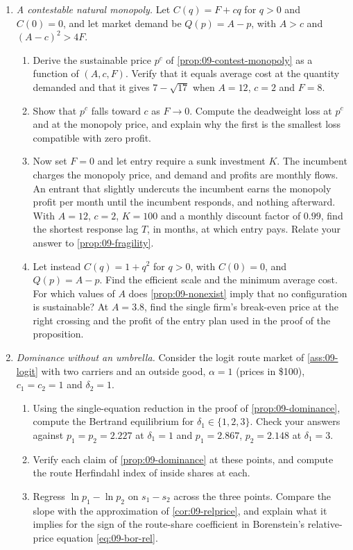 \begin{enumerate}[label=\arabic*., leftmargin=*, itemsep=6pt]

\item \emph{A contestable natural monopoly.} Let $C(q)=F+cq$ for $q>0$ and $C(0)=0$, and let market demand
be $Q(p)=A-p$, with $A>c$ and $(A-c)^2>4F$.
\begin{enumerate}[label=(\alph*)]
\item Derive the sustainable price $p^c$ of \cref{prop:09-contest-monopoly} as a function of $(A,c,F)$.
Verify that it equals average cost at the quantity demanded and that it gives $7-\sqrt{17}$ when $A=12$,
$c=2$ and $F=8$.
\item Show that $p^c$ falls toward $c$ as $F\to0$. Compute the deadweight loss at $p^c$ and at the monopoly
price, and explain why the first is the smallest loss compatible with zero profit.
\item Now set $F=0$ and let entry require a sunk investment $K$. The incumbent charges the monopoly price,
and demand and profits are monthly flows. An entrant that slightly undercuts the incumbent earns the monopoly
profit per month until the incumbent responds, and nothing afterward. With $A=12$, $c=2$, $K=100$ and a
monthly discount factor of $0.99$, find the shortest response lag $T$, in months, at which entry pays.
Relate your answer to \cref{prop:09-fragility}.
\item Let instead $C(q)=1+q^2$ for $q>0$, with $C(0)=0$, and $Q(p)=A-p$. Find the efficient scale and the
minimum average cost. For which values of $A$ does \cref{prop:09-nonexist} imply that no configuration is
sustainable? At $A=3.8$, find the single firm's break-even price at the right crossing and the profit of
the entry plan used in the proof of the proposition.
\end{enumerate}

\item \emph{Dominance without an umbrella.} Consider the logit route market of \cref{ass:09-logit} with two
carriers and an outside good, $\alpha=1$ (prices in \$100), $c_1=c_2=1$ and $\delta_2=1$.
\begin{enumerate}[label=(\alph*)]
\item Using the single-equation reduction in the proof of \cref{prop:09-dominance}, compute the Bertrand
equilibrium for $\delta_1\in\{1,2,3\}$. Check your answers against $p_1=p_2=2.227$ at $\delta_1=1$ and
$p_1=2.867$, $p_2=2.148$ at $\delta_1=3$.
\item Verify each claim of \cref{prop:09-dominance} at these points, and compute the route Herfindahl index of
inside shares at each.
\item Regress $\ln p_1-\ln p_2$ on $s_1-s_2$ across the three points. Compare the slope with the
approximation of \cref{cor:09-relprice}, and explain what it implies for the sign of the route-share
coefficient in Borenstein's relative-price equation \eqref{eq:09-bor-rel}.
\end{enumerate}


\end{enumerate}
